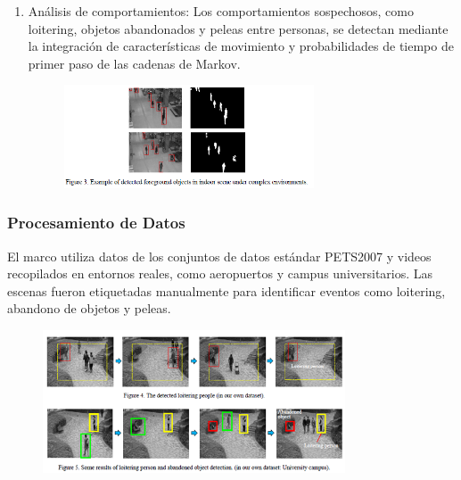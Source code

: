 \begin{enumerate}
    \item Análisis de comportamientos: Los comportamientos sospechosos, como loitering, objetos abandonados y peleas entre personas, se detectan mediante la integración de características de movimiento y probabilidades de tiempo de primer paso de las cadenas de Markov.

    \begin{figure}[h] %
    \centering
    \includegraphics[width=0.7\textwidth]{4/met8.2.png} %
    \label{fig:ejemplo} %
    \end{figure}
    
\end{enumerate}

\clearpage

\subsubsection{Procesamiento de Datos}
El marco utiliza datos de los conjuntos de datos estándar PETS2007 y videos recopilados en entornos reales, como aeropuertos y campus universitarios. Las escenas fueron etiquetadas manualmente para identificar eventos como loitering, abandono de objetos y peleas.

\begin{figure}[h] %
    \centering
    \includegraphics[width=0.8\textwidth]{4/pro8.png} %
    \label{fig:ejemplo} %
\end{figure}

